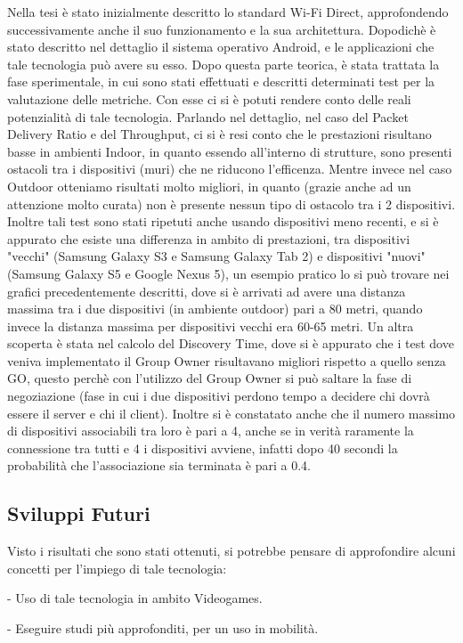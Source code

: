 Nella tesi è stato inizialmente descritto lo standard Wi-Fi Direct, approfondendo successivamente anche il suo funzionamento e la sua architettura.
Dopodichè è stato descritto nel dettaglio il sistema operativo Android, e le applicazioni che tale tecnologia può avere su esso.
Dopo questa parte teorica, è stata trattata la fase sperimentale, in cui sono stati effettuati e descritti determinati test per la valutazione delle metriche.
Con esse ci si è potuti rendere conto delle reali potenzialità di tale tecnologia.
Parlando nel dettaglio, nel caso del Packet Delivery Ratio e del Throughput, ci si è resi conto che le prestazioni risultano basse in ambienti Indoor, in quanto essendo all'interno di strutture, sono presenti ostacoli tra i dispositivi (muri) che ne riducono l'efficenza.
Mentre invece nel caso Outdoor otteniamo risultati molto migliori, in quanto (grazie anche ad un attenzione molto curata) non è presente nessun tipo di ostacolo tra i 2 dispositivi.
Inoltre tali test sono stati ripetuti anche usando dispositivi meno recenti, e si è appurato che esiste una differenza in ambito di prestazioni, tra dispositivi "vecchi" (Samsung Galaxy S3 e Samsung Galaxy Tab 2) e dispositivi "nuovi" (Samsung Galaxy S5 e Google Nexus 5), un esempio pratico lo si può trovare nei grafici precedentemente descritti, dove si è arrivati ad avere una distanza massima tra i due dispositivi (in ambiente outdoor) pari a 80 metri, quando invece la distanza massima per dispositivi vecchi era 60-65 metri.
Un altra scoperta è stata nel calcolo del Discovery Time, dove si è appurato che i test dove veniva implementato il Group Owner risultavano migliori rispetto a quello senza GO, questo perchè con l'utilizzo del Group Owner si può saltare la fase di negoziazione (fase in cui i due dispositivi perdono tempo a decidere chi dovrà essere il server e chi il client).
Inoltre si è constatato anche che il numero massimo di dispositivi associabili tra loro è pari a 4, anche se in verità raramente la connessione tra tutti e 4 i dispositivi avviene, infatti dopo 40 secondi la probabilità che l'associazione sia terminata è pari a 0.4.

\subsection{Sviluppi Futuri}

Visto i risultati che sono stati ottenuti, si potrebbe pensare di approfondire alcuni concetti per l'impiego di tale tecnologia:

- Uso di tale tecnologia in ambito Videogames.

- Eseguire studi più approfonditi, per un uso in mobilità.